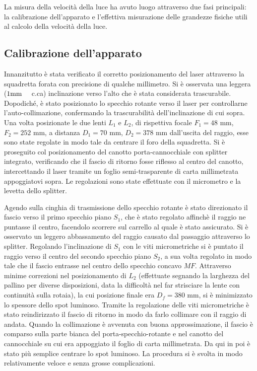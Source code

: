 \documentclass{article}
\begin{document}
        La misura della velocità della luce ha avuto luogo attraverso due fasi principali: la calibrazione dell'apparato e l'effettiva misurazione 
        delle grandezze fisiche utili al calcolo della velocità della luce.

        \subsection{Calibrazione dell'apparato}

            Innanzitutto è stata verificato il corretto posizionamento del laser attraverso la squadretta forata con precisione di qualche millimetro. 
            Si è osservata una leggera ($1 \qq*{mm}$ c.ca) inclinazione verso l'alto che è stata considerata trascurabile. 
            Dopodiché, è stato posizionato lo specchio rotante verso il laser per controllarne l'auto-collimazione, 
            confermando la trascurabilità dell'inclinazione di cui sopra. 
            Una volta posizionate le due lenti $L_1$ e $L_2$, di rispettiva focale $F_1 = 48$ mm, $F_2= 252$ mm, 
            a distanza $D_1= 70$ mm, $D_2=378$ mm dall'uscita del raggio, esse sono state regolate in modo tale da centrare il foro della squadretta. 
            Si è proseguito col posizionamento del canotto porta-cannocchiale con splitter integrato, verificando che il fascio di ritorno fosse riflesso 
            al centro del canotto, intercettando il laser tramite un foglio semi-trasparente di carta millimetrata appoggiatovi sopra. 
            Le regolazioni sono state effettuate con il micrometro e la levetta dello splitter.
            
            Agendo sulla cinghia di trasmissione dello specchio rotante è stato direzionato il fascio verso il primo specchio piano $S_1$, 
            che è stato regolato affinchè il raggio ne puntasse il centro, facendolo scorrere sul carrello al quale è stato assicurato. 
            Si è osservato un leggero abbassamento del raggio causato dal passaggio attraverso lo splitter. 
            Regolando l'inclinazione di $S_1$ con le viti micrometriche si è puntato il raggio verso il centro del secondo specchio piano $S_2$, 
            a sua volta regolato in modo tale che il fascio entrasse nel centro dello specchio concavo $MF$. 
            Attraverso minime correzioni nel posizionamento di $L_2$ (effettuate segnando la larghezza del pallino per diverse disposizioni, 
            data la difficoltà nel far strisciare la lente con continuità sulla rotaia), la cui posizione finale era $D_f=380$ mm, 
            si è minimizzato lo spessore dello spot luminoso. Tramite la regolazione delle viti micrometriche è stato reindirizzato il fascio di ritorno 
            in modo da farlo collimare con il raggio di andata. 
            Quando la collimazione è avvenuta con buona approssimazione, il fascio è comparso sulla parte bianca del porta-specchio-rotante e 
            nel canotto del cannocchiale su cui era appoggiato il foglio di carta millimetrata. Da qui in poi è stato più semplice centrare lo spot luminoso. 
            La procedura si è svolta in modo relativamente veloce e senza grosse complicazioni.
            
\end{document}
